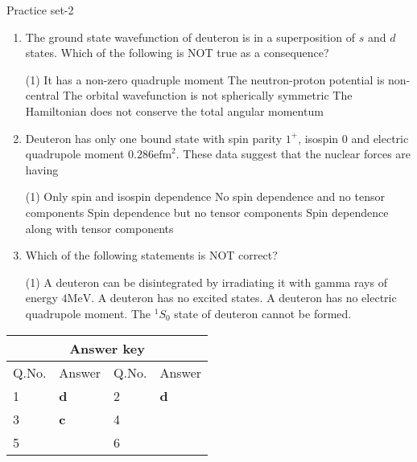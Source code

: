 \newpage
\begin{abox}
	Practice set-2
	\end{abox}
\begin{enumerate}
\item The ground state wavefunction of deuteron is in a superposition of $s$ and $d$ states. Which of the following is NOT true as a consequence?
{}
\begin{tasks}(1)
	\task[\textbf{A.}] It has a non-zero quadruple moment 
	\task[\textbf{B.}]The neutron-proton potential is non-central
	\task[\textbf{C.}] The orbital wavefunction is not spherically symmetric
	\task[\textbf{D.}]The Hamiltonian does not conserve the total angular momentum
\end{tasks}
\item Deuteron has only one bound state with spin parity $1^{+}$, isospin 0 and electric quadrupole moment $0.286 \mathrm{efm}^{2}$. These data suggest that the nuclear forces are having
{}
\begin{tasks}(1)
	\task[\textbf{A.}] Only spin and isospin dependence
	\task[\textbf{B.}] No spin dependence and no tensor components
	\task[\textbf{C.}]Spin dependence but no tensor components
	\task[\textbf{D.}]Spin dependence along with tensor components
\end{tasks}
\item Which of the following statements is NOT correct?
{}
\begin{tasks}(1)
	\task[\textbf{A.}] A deuteron can be disintegrated by irradiating it with gamma rays of energy $4 \mathrm{MeV}$.
	\task[\textbf{B.}] A deuteron has no excited states.
	\task[\textbf{C.}] A deuteron has no electric quadrupole moment.
	\task[\textbf{D.}] The ${ }^{1} S_{0}$ state of deuteron cannot be formed.
\end{tasks}	
\end{enumerate}
\setlength\arrayrulewidth{1pt}
\begin{table}[H]
	\centering
	\begin{tabular}{|p{1.5cm}|p{1.5cm}||p{1.5cm}|p{1.5cm}|}
		\hline
		\multicolumn{4}{|c|}{\textbf{Answer key}}\\\hline\hline
		\rowcolor{ocrel}Q.No.&Answer&Q.No.&Answer\\\hline
		1&\textbf{d} &2&\textbf{d}\\\hline 
		3&\textbf{c} &4&\textbf{} \\\hline
		5&\textbf{} &6&\textbf{} \\\hline
		
	\end{tabular}
\end{table}



